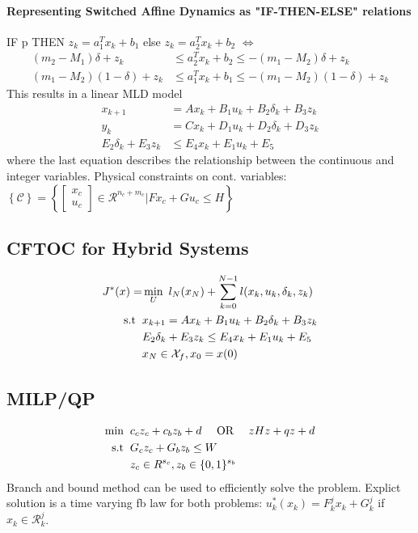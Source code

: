 \documentclass[landscape,a4paper,8pt]{scrartcl}
\newcommand{\mc}[1]{\mathcal{#1}}
\newcommand{\Me}[1]{\begin{bmatrix}#1\end{bmatrix}} %
\begin{document}
\begin{multicols*}{3}
\paragraph{Representing Switched Affine Dynamics as "IF-THEN-ELSE" relations}
IF p THEN $z_k = a_1^Tx_k+b_1$ else $z_k = a_2^Tx_k+b_2$ $\Leftrightarrow$
\begin{align*}
(m_2 - M_1)\delta + z_k &\leq a_2^T x_k + b_2 \leq - (m_1 - M_2)\delta + z_k \\
(m_1 - M_2)(1 -\delta) + z_k &\leq a_1^T x_k + b_1 \leq -(m_1 - M_2)(1 -\delta) + z_k
\end{align*}
This results in a linear MLD model
\begin{align*}
x_{k+1} &= A x_k + B_1 u_k + B_2 \delta_k + B_3 z_k \\
y_k &= C x_k  + D_1 u_k + D_2 \delta_k + D_3 z_k\\
E_2 \delta_k + E_3 z_k &\leq E_4 x_k + E_1 u_k + E_5
\end{align*}
where the last equation describes the relationship between the continuous and integer variables. Physical constraints on cont. variables:
$\left\{\mc{C}\right\} = \left\{ \Me{x_c\\u_c} \in \mc{R}^{n_c+m_c}| F x_c + G u_c \leq H\right\}$
\subsection{CFTOC for Hybrid Systems}\vspace*{-\baselineskip}
\begin{align*}
J^*(x)=&\min_U ~l_N (x_N) + \sum_{k=0}^{N-1} l(x_k,u_k,\delta_k,z_k)\\
\mathrm{s.t} \hspace*{2mm} & x_{k+1}=A x_k + B_1 u_k + B_2 \delta_k + B_3 z_k\\ &E_2 \delta_k + E_3 z_k \leq E_4 x_k + E_1 u_k + E_5\\&x_N \in \mc{X}_f, x_0 = x(0)
\end{align*}
\subsection{MILP/QP}\vspace*{-\baselineskip}
\begin{align*}
	\text{min}  \hspace*{2mm} &c_c z_c +  c_b z_b + d \quad \text{ OR } \quad z H z +  q z + d\\
	\mathrm{s.t} \hspace*{2mm} &G_c z_c + G_b z_b \leq W \\
	&z_c \in R^{s_c}, z_b \in\{0, 1\}^{s_b}
\end{align*}
Branch and bound method can be used to efficiently solve the problem.
Explict solution is a time varying fb law for both problems: $u_k^*(x_k) = F^j_k x_k + G_k^j$ if $x_k \in \mc{R}^j_k$.


\end{multicols*}
\end{document}
